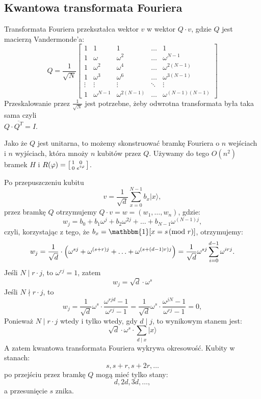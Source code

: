 \subsection*{Kwantowa transformata Fouriera}
Transformata Fouriera przekształca wektor \( v \) w wektor \( Q \cdot v \), gdzie \( Q \) jest macierzą Vandermonde'a:
\[
    Q = \frac{1}{\sqrt{N}} \begin{bmatrix}
        1 & 1 & 1 & \ldots & 1 \\
        1 & \omega & \omega^2 & \ldots & \omega^{N-1} \\
        1 & \omega^2 & \omega^4 & \ldots & \omega^{2(N-1)} \\
        1 & \omega^3 & \omega^6 & \ldots & \omega^{3(N-1)} \\
        \vdots & \vdots & \vdots & \ddots & \vdots \\
        1 & \omega^{N-1} & \omega^{2(N-1)} & \ldots & \omega^{(N-1)(N-1)}
    \end{bmatrix}
\]
Przeskalowanie przez \( \frac{1}{\sqrt{N}} \) jest potrzebne, żeby odwrotna transformata była taka sama czyli \\ \( Q \cdot \overline{Q^T} = I \).

Jako że \( Q \) jest unitarna, to możemy skonstruować bramkę Fouriera o \( n \) wejściach i \( n \) wyjściach, która mnoży \( n \) kubitów przez \( Q \).
Używamy do tego \( O(n^2) \) bramek \( H \) i \( R(\varphi) =
\left[\begin{smallmatrix}
    1 & 0 \\
    0 & e^{i\varphi}
\end{smallmatrix}\right]
\).

Po przepuszczeniu kubitu
\[
    v = \frac{1}{\sqrt{d}} \sum_{x=0}^{N-1} b_x |x\rangle,
\]
przez bramkę \( Q \) otrzymujemy \( Q \cdot v = w = (w_1, \ldots, w_n) \), gdzie:
\[
    w_j = b_0 + b_1 \omega^j + b_2 \omega^{2j} + \ldots + b_{N-1} \omega^{(N-1)j},
\]
czyli, korzystając z tego, że \( b_x = \mathbbm{1}[x = s \!\!\pmod{r}] \), otrzymujemy:
\[
    w_j = \frac{1}{\sqrt{d}} \cdot \left( \omega^{s j} + \omega^{(s + r) j} + \ldots + \omega^{(s + (d - 1)r) j} \right) = \frac{1}{\sqrt{d}} \omega^{s j} \sum_{i = 0}^{d - 1} \omega^{i r j}.
\]
Jeśli \( N \mid r \cdot j \), to \( \omega^{r j} = 1 \), zatem
\[
    w_j = \sqrt{d} \cdot \omega^{s}
\]
Jeśli \( N \nmid r \cdot j \), to
\[
    w_j = \frac{1}{\sqrt{d}} \omega^{s} \cdot \frac{\omega^{r j d} - 1}{\omega^{r j} - 1} = \frac{1}{\sqrt{d}} \omega^{s} \cdot \frac{\omega^{j N} - 1}{\omega^{r j} - 1} = 0,
\]
Ponieważ \( N \mid r \cdot j \) wtedy i tylko wtedy, gdy \( d \mid j \), to wynikowym stanem jest:
\[
    \sqrt{d} \cdot \omega^s \cdot \sum_{d \mid x} |x\rangle
\]
A zatem kwantowa transformata Fouriera wykrywa okresowość.
Kubity w stanach: \[ s, s + r, s + 2r, \ldots \] po przejściu przez bramkę \( Q \) mogą mieć tylko stany: \[ d, 2d, 3d, \ldots, \] a przesunięcie \( s \) znika.

